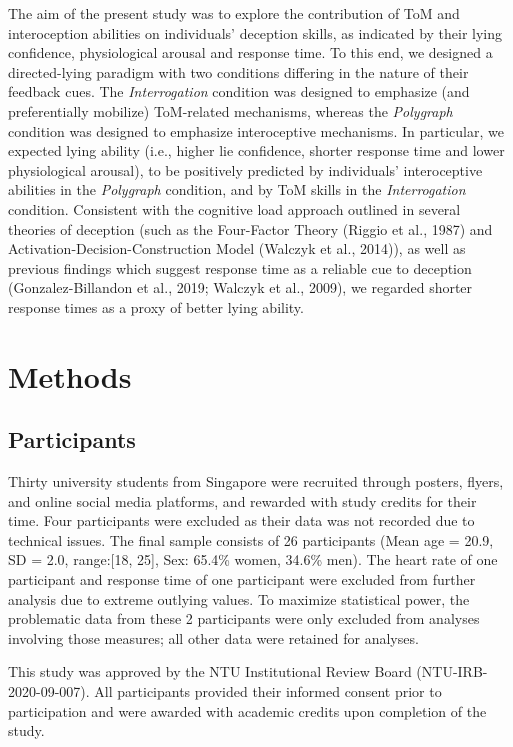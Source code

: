 \documentclass[
  man,mask,floatsintext]{apa6}
\begin{document}
The aim of the present study was to explore the contribution of ToM and interoception abilities on individuals' deception skills, as indicated by their lying confidence, physiological arousal and response time. To this end, we designed a directed-lying paradigm with two conditions differing in the nature of their feedback cues. The \emph{Interrogation} condition was designed to emphasize (and preferentially mobilize) ToM-related mechanisms, whereas the \emph{Polygraph} condition was designed to emphasize interoceptive mechanisms. In particular, we expected lying ability (i.e., higher lie confidence, shorter response time and lower physiological arousal), to be positively predicted by individuals' interoceptive abilities in the \emph{Polygraph} condition, and by ToM skills in the \emph{Interrogation} condition. Consistent with the cognitive load approach outlined in several theories of deception (such as the Four-Factor Theory (Riggio et al., 1987) and Activation-Decision-Construction Model (Walczyk et al., 2014)), as well as previous findings which suggest response time as a reliable cue to deception (Gonzalez-Billandon et al., 2019; Walczyk et al., 2009), we regarded shorter response times as a proxy of better lying ability.

\section{Methods}\label{methods}

\subsection{Participants}\label{participants}

Thirty university students from Singapore were recruited through posters, flyers, and online social media platforms, and rewarded with study credits for their time.
Four participants were excluded as their data was not recorded due to technical issues. The final sample consists of 26 participants (Mean age = 20.9, SD = 2.0, range:{[}18, 25{]}, Sex: 65.4\% women, 34.6\% men). The heart rate of one participant and response time of one participant were excluded from further analysis due to extreme outlying values. To maximize statistical power, the problematic data from these 2 participants were only excluded from analyses involving those measures; all other data were retained for analyses.

This study was approved by the NTU Institutional Review Board (NTU-IRB-2020-09-007). All participants provided their informed consent prior to participation and were awarded with academic credits upon completion of the study.
\end{document}
